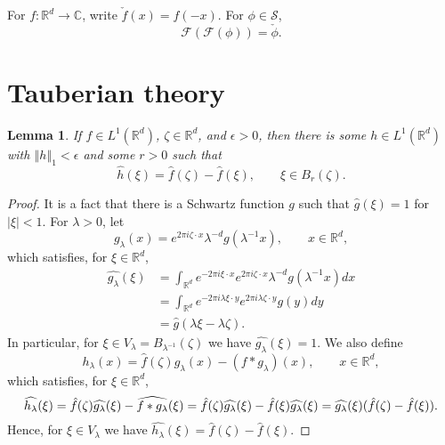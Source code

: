 \documentclass{article}
\newcommand{\norm}[1]{\left\Vert #1 \right\Vert}
\newtheorem{lemma}[theorem]{Lemma}
\theoremstyle{definition}
\begin{document}
For $f:\mathbb{R}^d \to \mathbb{C}$, write $\check{f}(x)=f(-x)$. For $\phi \in \mathscr{S}$,
\[
\mathscr{F}(\mathscr{F}(\phi))=\check{\phi}.
\]


\section{Tauberian theory}
\begin{lemma}
If $f \in L^1(\mathbb{R}^d)$, $\zeta \in \mathbb{R}^d$, and $\epsilon>0$, then there is some $h \in L^1(\mathbb{R}^d)$ with
$\norm{h}_1 < \epsilon$ and some $r>0$ such that 
\[
\hat{h}(\xi) = \hat{f}(\zeta)-\hat{f}(\xi), \qquad \xi \in B_r(\zeta).
\]
\label{nbdlemma}
\end{lemma}
\begin{proof}
It is a fact that there is a Schwartz function $g$ such that $\hat{g}(\xi)=1$ for $|\xi|<1$. 
For $\lambda>0$, let
\[
g_\lambda(x) = e^{2\pi i\zeta \cdot x} \lambda^{-d}g(\lambda^{-1}x), \qquad x \in \mathbb{R}^d,
\]
which satisfies, for $\xi \in \mathbb{R}^d$,
\begin{align*}
\widehat{g_\lambda}(\xi) &= \int_{\mathbb{R}^d} e^{-2\pi i\xi \cdot x} e^{2\pi i\zeta \cdot x} \lambda^{-d}g(\lambda^{-1}x) dx\\
&=\int_{\mathbb{R}^d} e^{-2\pi i \lambda \xi \cdot y} e^{2\pi i\lambda \zeta \cdot y}  g(y) dy\\
&=\hat{g}(\lambda \xi-\lambda \zeta).
\end{align*}
In particular, for $\xi \in V_\lambda = B_{\lambda^{-1}}(\zeta)$ we have
$\widehat{g_\lambda}(\xi) = 1$. 
We also define
\[
h_\lambda(x) = \hat{f}(\zeta) g_\lambda(x) - (f*g_\lambda)(x), \qquad
x \in \mathbb{R}^d,
\]
which satisfies, for $\xi \in \mathbb{R}^d$,
\[
\widehat{h_\lambda}(\xi)=\hat{f}(\zeta) \widehat{g_\lambda}(\xi)
-\widehat{f*g_\lambda}(\xi)\\
=\hat{f}(\zeta) \widehat{g_\lambda}(\xi) - \hat{f}(\xi) \widehat{g_\lambda}(\xi)
=\widehat{g_\lambda}(\xi)(\hat{f}(\zeta)-\hat{f}(\xi)).
\]
Hence, for $\xi \in V_\lambda$ we have $\widehat{h_\lambda}(\xi) = \hat{f}(\zeta)-\hat{f}(\xi)$.


\end{proof}
\end{document}

